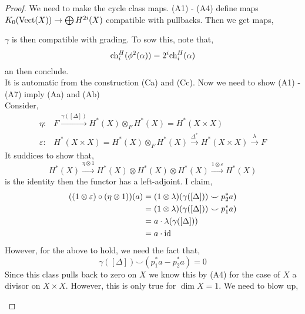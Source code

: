 \documentclass[12pt]{article}
\begin{document}
\begin{proof}
We need to make the cycle class maps. (A1) - (A4) define maps $K_0(\mathrm{Vect}(X)) \to \bigoplus H^{2i}(X)$ compatible with pullbacks. Then we get maps,
\begin{center}
\end{center}
$\gamma$ is then compatible with grading. To sow this, note that,
\[ \mathrm{ch}_i^H(\phi^2(\alpha)) = 2^i \mathrm{ch}^H_i(\alpha) \]
an then conclude. 
\bigskip\\
It is automatic from the construction (Ca) and (Cc).
Now we need to show (A1) - (A7) imply (Aa) and (Ab)
\bigskip\\
Consider,
\begin{align*}
\eta : & F \xrightarrow{\gamma([\Delta])} H^*(X) \otimes_F H^*(X) = H^*(X \times X) 
\\
\varepsilon : & H^*(X \times X) = H^*(X) \otimes_F H^*(X) \xrightarrow{\Delta^*} H^*(X \times X) \xrightarrow{\lambda} F
\end{align*}
It suddices to show that,
\[ H^*(X) \xrightarrow{\eta \otimes 1} H^*(X) \otimes H^*(X) \otimes H^*(X) \xrightarrow{1 \otimes \varepsilon} H^*(X) \]
is the identity then the functor has a left-adjoint. I claim,
\begin{align*}
((1 \otimes \varepsilon) \circ (\eta \otimes 1))(a) & = (1 \otimes \lambda) (\gamma([\Delta])) \smile p_2^* a) 
\\
& = (1 \otimes \lambda) (\gamma([\Delta])) \smile p_1^* a) 
\\
& = a \cdot \lambda(\gamma([\Delta]))
\\
& = a \cdot \mathrm{id}
\end{align*}
However, for the above to hold, we need the fact that,
\[ \gamma([\Delta]) \smile (p_1^* a - p_2^* a) = 0 \]
Since this class pulls back to zero on $X$ we know this by (A4) for the case of $X$ a divisor on $X \times X$. However, this is only true for $\dim{X} = 1$. We need to blow up,
\begin{center}

\end{center}
\end{proof}
\end{document}
